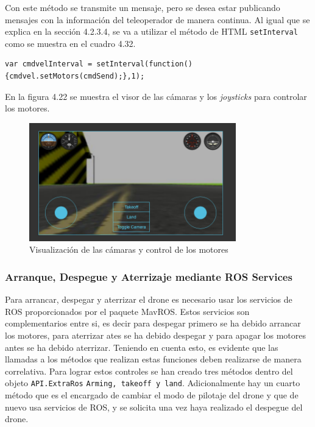 Con este método se transmite un mensaje, pero se desea estar publicando mensajes con la información del teleoperador de manera continua. Al igual que se explica en la sección 4.2.3.4, se va a utilizar el método de HTML \texttt{setInterval} como se muestra en el cuadro 4.32.

\begin{lstlisting}[caption= Publicación continua del mensaje con la información del teleoperador, label=cod.intervalMotors]
var cmdvelInterval = setInterval(function(){cmdvel.setMotors(cmdSend);},1);
\end{lstlisting}

En la figura 4.22 se muestra el visor de las cámaras y los \textit{joysticks} para controlar los motores.

\begin{figure}[H]
  \begin{center}
    \includegraphics[width=0.8\textwidth]{figures/camaradrone.png}
		\caption{Visualización de las cámaras y control de los motores}
		\label{fig.camaradrone}
		\end{center}
\end{figure}

\subsubsection{Arranque, Despegue y Aterrizaje mediante ROS Services}

Para arrancar, despegar y aterrizar el drone es necesario usar los servicios de ROS proporcionados por el paquete MavROS. Estos servicios son complementarios entre si, es decir para despegar primero se ha debido arrancar los motores, para aterrizar ates se ha debido despegar y para apagar los motores antes se ha debido aterrizar. Teniendo en cuenta esto, es evidente que las llamadas a los métodos que realizan estas funciones deben realizarse de manera correlativa. Para lograr estos controles se han creado tres métodos dentro del objeto \texttt{API.ExtraRos} \texttt{Arming, takeoff y land}. Adicionalmente hay un cuarto método que es el encargado de cambiar el modo de pilotaje del drone y que de nuevo usa servicios de ROS, y se solicita una vez haya realizado el despegue del drone.

